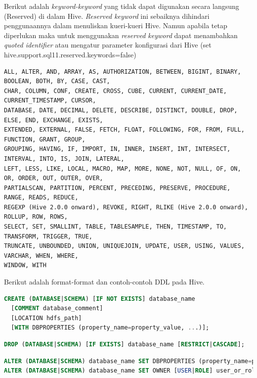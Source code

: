 Berikut adalah \textit{keyword-keyword} yang tidak dapat digunakan secara langsung (Reserved) di dalam Hive. \textit{Reserved keyword}  ini sebaiknya dihindari penggunaannya dalam menuliskan kueri-kueri Hive. Namun apabila tetap diperlukan maka untuk menggunakan \textit{reserved keyword} dapat menambahkan \textit{quoted identifier} atau mengatur parameter konfigurasi dari Hive (set hive.support.sql11.reserved.keywords=false)

\begin{lstlisting}[basicstyle=\tiny,caption=Reserved Keywords]
ALL, ALTER, AND, ARRAY, AS, AUTHORIZATION, BETWEEN, BIGINT, BINARY, BOOLEAN, BOTH, BY, CASE, CAST, 
CHAR, COLUMN, CONF, CREATE, CROSS, CUBE, CURRENT, CURRENT_DATE, CURRENT_TIMESTAMP, CURSOR, 
DATABASE, DATE, DECIMAL, DELETE, DESCRIBE, DISTINCT, DOUBLE, DROP, ELSE, END, EXCHANGE, EXISTS, 
EXTENDED, EXTERNAL, FALSE, FETCH, FLOAT, FOLLOWING, FOR, FROM, FULL, FUNCTION, GRANT, GROUP, 
GROUPING, HAVING, IF, IMPORT, IN, INNER, INSERT, INT, INTERSECT, INTERVAL, INTO, IS, JOIN, LATERAL, 
LEFT, LESS, LIKE, LOCAL, MACRO, MAP, MORE, NONE, NOT, NULL, OF, ON, OR, ORDER, OUT, OUTER, OVER, 
PARTIALSCAN, PARTITION, PERCENT, PRECEDING, PRESERVE, PROCEDURE, RANGE, READS, REDUCE, 
REGEXP (Hive 2.0.0 onward), REVOKE, RIGHT, RLIKE (Hive 2.0.0 onward), ROLLUP, ROW, ROWS, 
SELECT, SET, SMALLINT, TABLE, TABLESAMPLE, THEN, TIMESTAMP, TO, TRANSFORM, TRIGGER, TRUE, 
TRUNCATE, UNBOUNDED, UNION, UNIQUEJOIN, UPDATE, USER, USING, VALUES, VARCHAR, WHEN, WHERE, 
WINDOW, WITH
\end{lstlisting}

Berikut adalah format-format dan contoh-contoh DDL pada Hive.

\begin{lstlisting}[language=sql,basicstyle=\tiny,caption=DDL untuk create database]
CREATE (DATABASE|SCHEMA) [IF NOT EXISTS] database_name
  [COMMENT database_comment]
  [LOCATION hdfs_path]
  [WITH DBPROPERTIES (property_name=property_value, ...)];
\end{lstlisting}

\begin{lstlisting}[language=sql,basicstyle=\tiny,caption=DDL untuk drop database]
DROP (DATABASE|SCHEMA) [IF EXISTS] database_name [RESTRICT|CASCADE];
\end{lstlisting}

\begin{lstlisting}[language=sql,basicstyle=\tiny,caption=DDL untuk alter database]
ALTER (DATABASE|SCHEMA) database_name SET DBPROPERTIES (property_name=property_value, ...);   -- (Note: SCHEMA added in Hive 0.14.0)
ALTER (DATABASE|SCHEMA) database_name SET OWNER [USER|ROLE] user_or_role;   -- (Note: Hive 0.13.0 and later; SCHEMA added in Hive 0.14.0)
\end{lstlisting}

